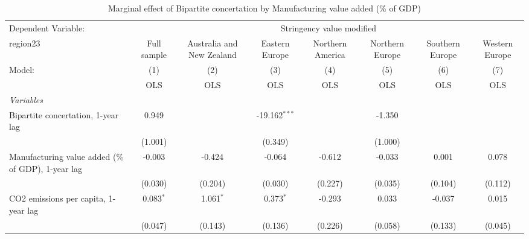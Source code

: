 
\begin{table}[htbp]
   \caption{Marginal effect of Bipartite concertation by Manufacturing value added (\% of GDP)}
   \centering
   \begin{tabular}{lccccccc}
      \toprule
      Dependent Variable: & \multicolumn{7}{c}{Stringency value modified}\\
      region23                                                                                & Full sample   & Australia and New Zealand & Eastern Europe  & Northern America & Northern Europe & Southern Europe & Western Europe \\   
      Model:                                                                                  & (1)           & (2)                       & (3)             & (4)              & (5)             & (6)             & (7)\\  
                                                                                              &  OLS          & OLS                       & OLS             & OLS              & OLS             & OLS             & OLS\\  
      \midrule
      \emph{Variables}\\
      Bipartite concertation, 1-year lag                                                      & 0.949         &                           & -19.162$^{***}$ &                  & -1.350          &                 &   \\   
                                                                                              & (1.001)       &                           & (0.349)         &                  & (1.000)         &                 &   \\   
      Manufacturing value added (\% of GDP), 1-year lag                                       & -0.003        & -0.424                    & -0.064          & -0.612           & -0.033          & 0.001           & 0.078\\   
                                                                                              & (0.030)       & (0.204)                   & (0.030)         & (0.227)          & (0.035)         & (0.104)         & (0.112)\\   
      CO2 emissions per capita, 1-year lag                                                    & 0.083$^{*}$   & 1.061$^{*}$               & 0.373$^{*}$     & -0.293           & 0.033           & -0.037          & 0.015\\   
                                                                                              & (0.047)       & (0.143)                   & (0.136)         & (0.226)          & (0.058)         & (0.133)         & (0.045)\\   

\end{tabular}
\end{table}
